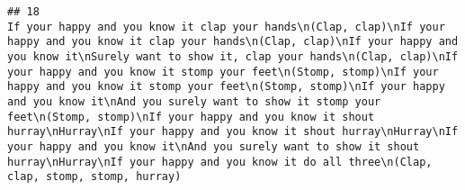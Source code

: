 \documentclass[]{article}
\begin{document}
\begin{verbatim}
## 18                                                                                                                                                                                                                                                                                                                                                                                                                                                                                                                                                                                                                                                                                                                                                                                                                                                                                                                                                                                                                                                                                                                                                                                                                                                                                                                                                                                                                                                                                                                                                                                                                                                                                                                                                                                                                                                                                                                                                                                                                                                                                                                                                                                                                                                                                                                                                                                                                   If your happy and you know it clap your hands\n(Clap, clap)\nIf your happy and you know it clap your hands\n(Clap, clap)\nIf your happy and you know it\nSurely want to show it, clap your hands\n(Clap, clap)\nIf your happy and you know it stomp your feet\n(Stomp, stomp)\nIf your happy and you know it stomp your feet\n(Stomp, stomp)\nIf your happy and you know it\nAnd you surely want to show it stomp your feet\n(Stomp, stomp)\nIf your happy and you know it shout hurray\nHurray\nIf your happy and you know it shout hurray\nHurray\nIf your happy and you know it\nAnd you surely want to show it shout hurray\nHurray\nIf your happy and you know it do all three\n(Clap, clap, stomp, stomp, hurray)

\end{verbatim}
\end{document}
